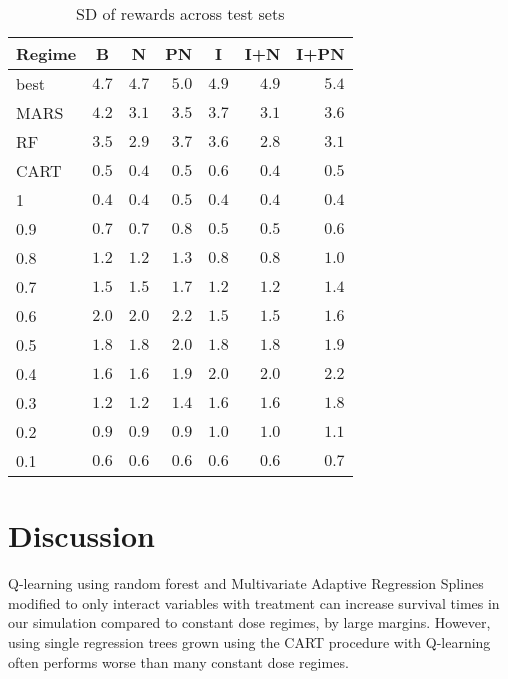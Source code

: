 \documentclass[12pt]{article}
\begin{document}
\begin{table}[!htbp]
\caption[SD of rewards across test sets]{SD of rewards across test sets\label{tab:sd-test-rewards}} 
\begin{center}
\begin{tabular}{lrrrrrr}
\toprule
\multicolumn{1}{c}{Regime}&\multicolumn{1}{c}{B}&\multicolumn{1}{c}{N}&\multicolumn{1}{c}{PN}&\multicolumn{1}{c}{I}&\multicolumn{1}{c}{I+N}&\multicolumn{1}{c}{I+PN}\tabularnewline
\midrule
best&$4.7$&$4.7$&$5.0$&$4.9$&$4.9$&$5.4$\tabularnewline
MARS&$4.2$&$3.1$&$3.5$&$3.7$&$3.1$&$3.6$\tabularnewline
RF&$3.5$&$2.9$&$3.7$&$3.6$&$2.8$&$3.1$\tabularnewline
CART&$0.5$&$0.4$&$0.5$&$0.6$&$0.4$&$0.5$\tabularnewline
1&$0.4$&$0.4$&$0.5$&$0.4$&$0.4$&$0.4$\tabularnewline
0.9&$0.7$&$0.7$&$0.8$&$0.5$&$0.5$&$0.6$\tabularnewline
0.8&$1.2$&$1.2$&$1.3$&$0.8$&$0.8$&$1.0$\tabularnewline
0.7&$1.5$&$1.5$&$1.7$&$1.2$&$1.2$&$1.4$\tabularnewline
0.6&$2.0$&$2.0$&$2.2$&$1.5$&$1.5$&$1.6$\tabularnewline
0.5&$1.8$&$1.8$&$2.0$&$1.8$&$1.8$&$1.9$\tabularnewline
0.4&$1.6$&$1.6$&$1.9$&$2.0$&$2.0$&$2.2$\tabularnewline
0.3&$1.2$&$1.2$&$1.4$&$1.6$&$1.6$&$1.8$\tabularnewline
0.2&$0.9$&$0.9$&$0.9$&$1.0$&$1.0$&$1.1$\tabularnewline
0.1&$0.6$&$0.6$&$0.6$&$0.6$&$0.6$&$0.7$\tabularnewline
\bottomrule
\end{tabular}\end{center}
\end{table}


\section{Discussion} %
\label{sec:discussion}


Q-learning using random forest and Multivariate Adaptive Regression Splines modified to only interact variables with treatment can increase survival times in our simulation compared to constant dose regimes, by large margins. However, using single regression trees grown using the CART procedure with Q-learning often performs worse than many constant dose regimes.
\end{document}
